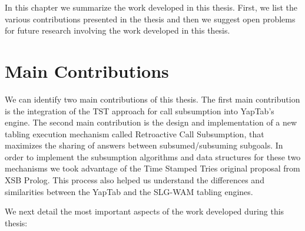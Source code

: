 
In this chapter we summarize the work developed in this thesis. First, we list the various contributions
presented in the thesis and then we suggest open problems for future research involving the work
developed in this thesis.

\section{Main Contributions}

We can identify two main contributions of this thesis. The first main contribution is the integration of
the TST approach for call subsumption into YapTab's engine. The second main contribution is the design and implementation
of a new tabling execution mechanism called Retroactive Call Subsumption, that maximizes the sharing of answers
between subsumed/subsuming subgoals. In order to implement the subsumption algorithms and data structures for
these two mechanisms we took advantage of the Time Stamped Tries original proposal from XSB Prolog.
This process also helped us understand the differences and similarities between the YapTab and the SLG-WAM tabling engines.

We next detail the most important aspects of the work developed during this thesis:

